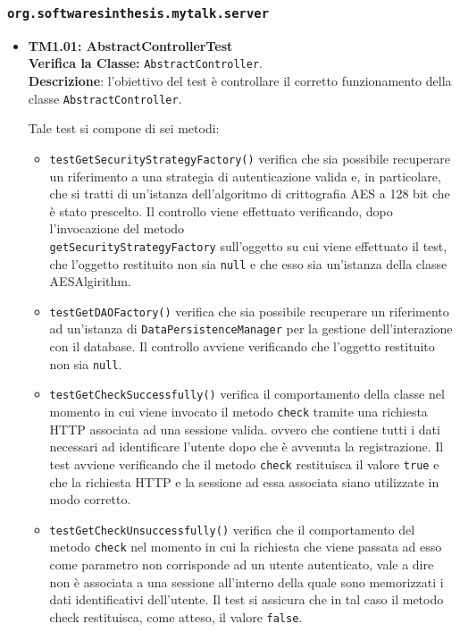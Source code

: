 \subsubsection{\texttt{org.softwaresinthesis.mytalk.server}}
\begin{itemize}

\item \textbf{TM1.01: AbstractControllerTest}\\
\textbf{Verifica la Classe:} \texttt{AbstractController}.\\
\textbf{Descrizione}: l'obiettivo del test è controllare il corretto funzionamento della classe \texttt{AbstractController}.
 
Tale test si compone di sei metodi:
 \begin{itemize}
 
\item \texttt{testGetSecurityStrategyFactory()} verifica che sia possibile recuperare un riferimento a una strategia di autenticazione valida e, in particolare, che si tratti di un'istanza dell'algoritmo di crittografia AES a 128 bit che è stato prescelto. Il controllo viene effettuato verificando, dopo l'invocazione del metodo \\ \texttt{getSecurityStrategyFactory} sull'oggetto su cui viene effettuato il test, che l'oggetto restituito non sia \texttt{null} e che esso sia un'istanza della classe AESAlgirithm.

\item \texttt{testGetDAOFactory()} verifica che sia possibile recuperare un riferimento ad un'istanza di \texttt{DataPersistenceManager} per la gestione dell'interazione con il database. Il controllo avviene verificando che l'oggetto restituito non sia \texttt{null}.

\item \texttt{testGetCheckSuccessfully()} verifica il comportamento della classe nel momento in cui viene invocato il metodo \texttt{check} tramite una richiesta HTTP associata ad una sessione valida. ovvero che contiene tutti i dati necessari ad identificare l'utente dopo che è avvenuta la registrazione. Il test avviene verificando che il metodo \texttt{check} restituisca il valore \texttt{true} e che la richiesta HTTP e la sessione ad essa associata siano utilizzate in modo corretto.

\item \texttt{testGetCheckUnsuccessfully()} verifica che il comportamento del metodo \texttt{check} nel momento in cui la richiesta che viene passata ad esso come parametro non corrisponde ad un utente autenticato, vale a dire non è associata a una sessione all'interno della quale sono memorizzati i dati identificativi dell'utente. Il test si assicura che in tal caso il metodo check restituisca, come atteso, il valore \texttt{false}.


\end{itemize}
\end{itemize}
